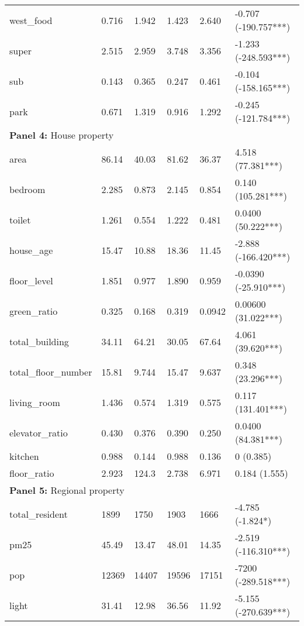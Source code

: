 \begin{tabular}{llllll}
west\_food & 0.716 & 1.942 & 1.423 & 2.640 & -0.707 (-190.757***) \\
super & 2.515 & 2.959 & 3.748 & 3.356 & -1.233 (-248.593***) \\
sub & 0.143 & 0.365 & 0.247 & 0.461 & -0.104 (-158.165***) \\
park & 0.671 & 1.319 & 0.916 & 1.292 & -0.245 (-121.784***) \\
\multicolumn{6}{l}{\textbf{Panel 4: }House property} \\
area & 86.14 & 40.03 & 81.62 & 36.37 & 4.518 (77.381***) \\
bedroom & 2.285 & 0.873 & 2.145 & 0.854 & 0.140 (105.281***) \\
toilet & 1.261 & 0.554 & 1.222 & 0.481 & 0.0400 (50.222***) \\
house\_age & 15.47 & 10.88 & 18.36 & 11.45 & -2.888 (-166.420***) \\
floor\_level & 1.851 & 0.977 & 1.890 & 0.959 & -0.0390 (-25.910***) \\
green\_ratio & 0.325 & 0.168 & 0.319 & 0.0942 & 0.00600 (31.022***) \\
total\_building & 34.11 & 64.21 & 30.05 & 67.64 & 4.061 (39.620***) \\
total\_floor\_number & 15.81 & 9.744 & 15.47 & 9.637 & 0.348 (23.296***) \\
living\_room & 1.436 & 0.574 & 1.319 & 0.575 & 0.117 (131.401***) \\
elevator\_ratio & 0.430 & 0.376 & 0.390 & 0.250 & 0.0400 (84.381***) \\
kitchen & 0.988 & 0.144 & 0.988 & 0.136 & 0 (0.385) \\
floor\_ratio & 2.923 & 124.3 & 2.738 & 6.971 & 0.184 (1.555) \\
\multicolumn{6}{l}{\textbf{Panel 5: }Regional property} \\
total\_resident & 1899 & 1750 & 1903 & 1666 & -4.785 (-1.824*) \\
pm25 & 45.49 & 13.47 & 48.01 & 14.35 & -2.519 (-116.310***) \\
pop & 12369 & 14407 & 19596 & 17151 & -7200 (-289.518***) \\
light & 31.41 & 12.98 & 36.56 & 11.92 & -5.155 (-270.639***) \\
\bottomrule
\end{tabular}
